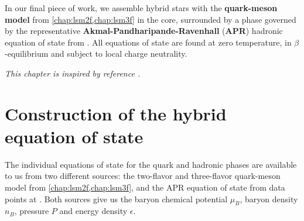 In our final piece of work,
we assemble hybrid stars with the \textbf{quark-meson model} from \cref{chap:lsm2f,chap:lsm3f} in the core,
surrounded by a phase governed by the representative \textbf{Akmal-Pandharipande-Ravenhall} (\textbf{APR}) hadronic equation of state from \cite{ref:apr}.
All equations of state are found at zero temperature, in $\beta$-equilibrium and subject to local charge neutrality.

\textit{This chapter is inspired by reference \cite{ref:quark_star_review}.}

\section{Construction of the hybrid equation of state}
\label{sec:hybrid:construction}

The individual equations of state for the quark and hadronic phases are available to us from two different sources:
the two-flavor and three-flavor quark-meson model from \cref{chap:lsm2f,chap:lsm3f},
and the APR equation of state from data points at \cite{ref:apr_data}.
Both sources give us the baryon chemical potential $\mu_B$, baryon density $n_B$, pressure $P$ and energy density $\epsilon$.

